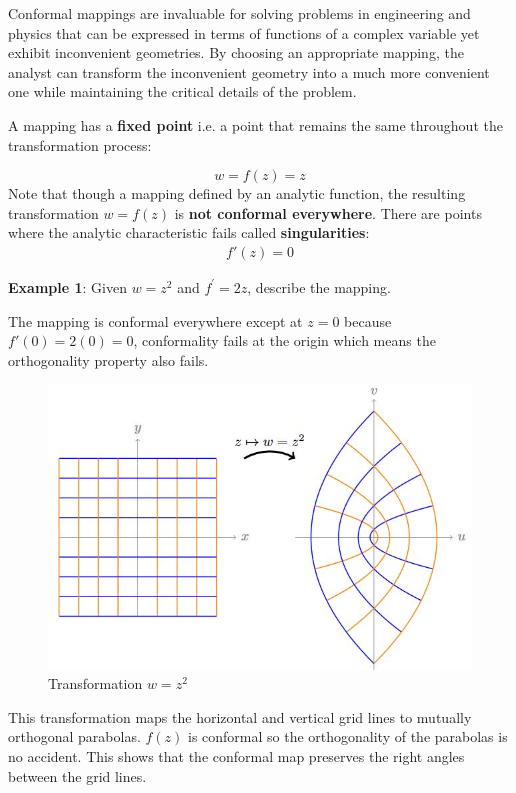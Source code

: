 \documentclass[10pt,a4paper]{article}
\begin{document}
Conformal mappings are invaluable for solving problems in engineering and physics that can be
expressed in terms of functions of a complex variable yet exhibit inconvenient geometries. By
choosing an appropriate mapping, the analyst can transform the inconvenient geometry into a much
more convenient one while maintaining the critical details of the problem.

\pagebreak

A mapping has a \textbf{fixed point} i.e. a point that remains the same throughout the
transformation process: \par 
$$
    w=f(z)=z
$$ 
Note that though a mapping defined by an analytic function, the resulting transformation $w=f(z)$ is
\textbf{not conformal everywhere}. There are points where the analytic characteristic fails called
\textbf{singularities}:
\begin{align*}
    f'(z)=0
\end{align*} 

\textbf{Example 1}: Given $w=z^2$ and $f^{\prime}=2z$, describe the mapping. \par 
The mapping is conformal everywhere except at $z=0$ because $f'(0)=2(0)=0$, conformality fails at the
origin which means the orthogonality property also fails. \par
\begin{figure} [h!]
    \centering
    \includegraphics[scale=0.7]{conformal.JPG}
    \caption{Transformation $w=z^2$}
\end{figure}
This transformation maps the horizontal and vertical grid lines to mutually orthogonal parabolas.
$f(z)$ is conformal so the orthogonality of the parabolas is no accident. This shows that the
conformal map preserves the right angles between the grid lines.
\end{document}
